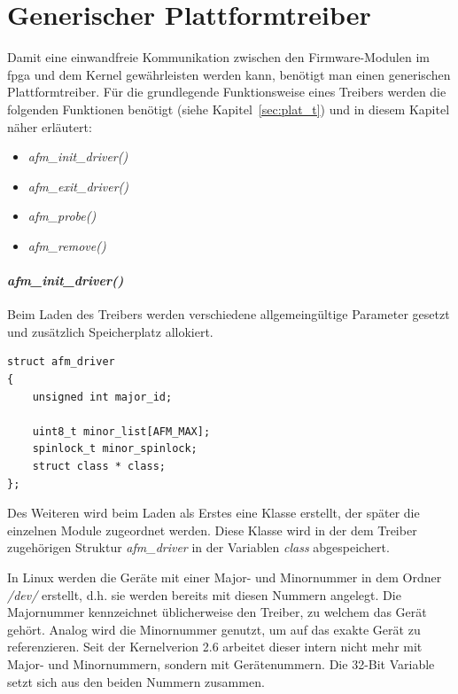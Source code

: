\section{Generischer Plattformtreiber} \label{sec:plat}
Damit eine einwandfreie Kommunikation zwischen den Firmware-Modulen im \ac{fpga} und dem Kernel gewährleisten werden kann, benötigt man einen generischen Plattformtreiber.
Für die grundlegende  Funktionsweise eines Treibers werden die folgenden Funktionen benötigt (siehe Kapitel~\ref{sec:plat_t}) und in diesem Kapitel näher erläutert:
\begin{itemize}
	\item \textit{afm\_init\_driver()}
	\item \textit{afm\_exit\_driver()}
	\item \textit{afm\_probe()}
	\item \textit{afm\_remove()}
\end{itemize}


\paragraph*{\textit{afm\_init\_driver()}}
Beim Laden des Treibers werden verschiedene allgemeingültige Parameter gesetzt und zusätzlich Speicherplatz allokiert. 


\begin{lstfloat}
\begin{lstlisting}
struct afm_driver
{
	unsigned int major_id;

	uint8_t minor_list[AFM_MAX];
	spinlock_t minor_spinlock;
	struct class * class;
};
\end{lstlisting}
\end{lstfloat}

Des Weiteren wird beim Laden als Erstes eine Klasse erstellt, der später die einzelnen Module zugeordnet werden. Diese Klasse wird in der dem Treiber zugehörigen Struktur \textit{afm\_driver} in der Variablen \textit{class} abgespeichert. 

In Linux werden die Geräte mit einer Major- und Minornummer in dem Ordner \textit{/dev/} erstellt, d.h. sie werden bereits mit diesen Nummern angelegt.
Die Majornummer kennzeichnet üblicherweise den Treiber, zu welchem das Gerät gehört. Analog wird die Minornummer genutzt, um auf das exakte Gerät zu referenzieren. \citep[S. 43f.]{corbet2005linux} %
Seit der Kernelverion 2.6 arbeitet dieser intern nicht mehr mit Major- und Minornummern, sondern mit Gerätenummern. Die 32-Bit Variable setzt sich aus den beiden Nummern zusammen. \citep[Seite 244]{schroder2009embedded}%

